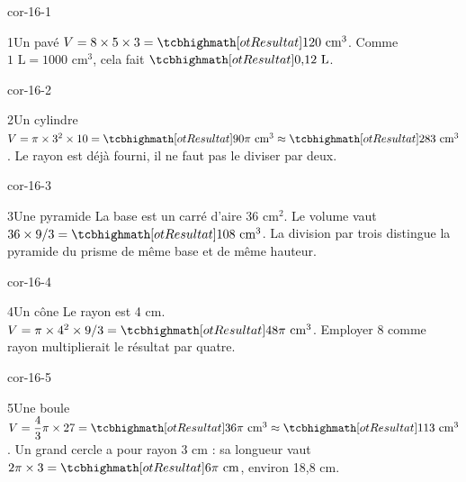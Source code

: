 \clearpage\pagestyle{otMain}\fontsize{11}{15}\selectfont{}
\begin{blocLivre}{cor-16-1}\begin{corrige}{1}{Un pavé}
$V=8\times5\times3=\res{120\text{ cm}^3}$. Comme $1\text{ L}=1000\text{ cm}^3$, cela fait $\res{0{,}12\text{ L}}$.
\label{fig-cor-16-1}
\end{corrige}\end{blocLivre}
\begin{blocLivre}{cor-16-2}\begin{corrige}{2}{Un cylindre}
$V=\pi\times3^2\times10=\res{90\pi\text{ cm}^3}\approx\res{283\text{ cm}^3}$. Le rayon est déjà fourni, il ne faut pas le diviser par deux.
\label{fig-cor-16-2}
\end{corrige}\end{blocLivre}
\begin{blocLivre}{cor-16-3}\begin{corrige}{3}{Une pyramide}
La base est un carré d’aire 36 cm$^2$. Le volume vaut $36\times9/3=\res{108\text{ cm}^3}$. La division par trois distingue la pyramide du prisme de même base et de même hauteur.
\label{fig-cor-16-3}
\end{corrige}\end{blocLivre}
\begin{blocLivre}{cor-16-4}\begin{corrige}{4}{Un cône}
Le rayon est 4 cm. $V=\pi\times4^2\times9/3=\res{48\pi\text{ cm}^3}$. Employer 8 comme rayon multiplierait le résultat par quatre.
\label{fig-cor-16-4}
\end{corrige}\end{blocLivre}
\begin{blocLivre}{cor-16-5}\begin{corrige}{5}{Une boule}
$V=\dfrac43\pi\times27=\res{36\pi\text{ cm}^3}\approx\res{113\text{ cm}^3}$. Un grand cercle a pour rayon 3 cm : sa longueur vaut $2\pi\times3=\res{6\pi\text{ cm}}$, environ 18,8 cm.
\label{fig-cor-16-5}
\end{corrige}\end{blocLivre}
